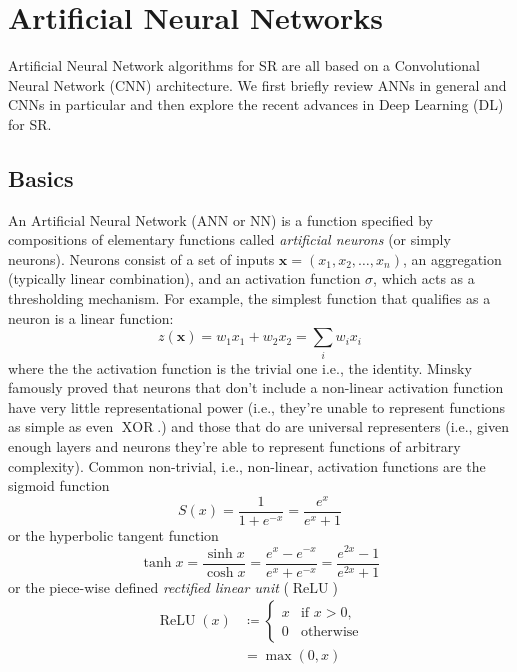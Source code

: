 %
\section{Artificial Neural Networks}\label{sec:neural-networks}
\localtableofcontents
Artificial Neural Network algorithms for SR are all based on a Convolutional Neural Network (CNN) architecture.
%
We first briefly review ANNs in general and CNNs in particular and then explore the recent advances in Deep Learning (DL) for SR.
%
\subsection{Basics}

An Artificial Neural Network (ANN or NN) is a function specified by compositions of elementary functions called \textit{artificial neurons} (or simply neurons).
%
Neurons consist of a set of inputs \(\mathbf{x} = (x_1, x_2, \dots, x_n)\), an aggregation (typically linear combination), and an activation function \(\sigma\), which acts as a thresholding mechanism.
%
For example, the simplest function that qualifies as a neuron is a linear function:
\begin{equation}
    z(\mathbf{x}) = w_1 x_1 + w_2 x_2 = \sum_i w_i x_i
    \label{eqn:simpleann}
\end{equation}
where the the activation function is the trivial one i.e., the identity.
%
Minsky \etal\cite{minsky2017perceptrons} famously proved that neurons that don't include a non-linear activation function have very little representational power (i.e., they're unable to represent functions as simple as even \(\operatorname{XOR}\).) and those that do are universal representers (i.e., given enough layers and neurons they're able to represent functions of arbitrary complexity).
%
Common non-trivial, i.e., non-linear, activation functions are the sigmoid function
\begin{equation}
    S(x)={\frac {1}{1+e^{-x}}}={\frac {e^{x}}{e^{x}+1}}
\end{equation}
or the hyperbolic tangent function
\begin{equation}
    \tanh x={\frac {\sinh x}{\cosh x}}={\frac {e^{x}-e^{-x}}{e^{x}+e^{-x}}}={\frac {e^{2x}-1}{e^{2x}+1}}
\end{equation}
or the piece-wise defined \textit{rectified linear unit} (\(\operatorname{ReLU}\))
\begin{align}
    \operatorname{ReLU}(x) & \coloneqq \begin{cases}x&{\text{if }}x>0,\\0&{\text{otherwise}}\end{cases} \\
                           & = \max(0, x)
\end{align}
